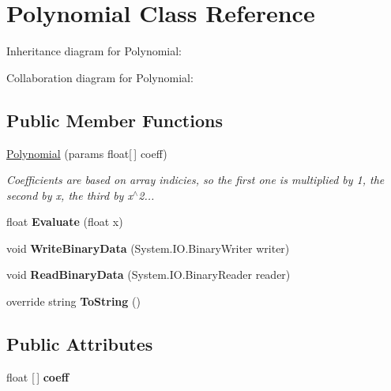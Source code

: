 \hypertarget{class_polynomial}{}\section{Polynomial Class Reference}
\label{class_polynomial}


Inheritance diagram for Polynomial\+:


Collaboration diagram for Polynomial\+:
\subsection*{Public Member Functions}
\begin{DoxyCompactItemize}
\item 
\hyperlink{class_polynomial_ad2d3944cfa448882204a0e698c2aa8c9}{Polynomial} (params float\mbox{[}$\,$\mbox{]} coeff)
\begin{DoxyCompactList}\small\item\em Coefficients are based on array indicies, so the first one is multiplied by 1, the second by x, the third by x$^\wedge$2... \end{DoxyCompactList}\item 
\mbox{\label{class_polynomial_a69e0b58ea78e39523e9b5e450be65fac}} 
float {\bfseries Evaluate} (float x)
\item 
\mbox{\label{class_polynomial_a675380767e4a19b06e2633d93ddeb415}} 
void {\bfseries Write\+Binary\+Data} (System.\+I\+O.\+Binary\+Writer writer)
\item 
\mbox{\label{class_polynomial_af7c4000b07055328c00e87979d7eee06}} 
void {\bfseries Read\+Binary\+Data} (System.\+I\+O.\+Binary\+Reader reader)
\item 
\mbox{\label{class_polynomial_a651a737e165ec271e9b8731021d1277f}} 
override string {\bfseries To\+String} ()
\end{DoxyCompactItemize}
\subsection*{Public Attributes}
\begin{DoxyCompactItemize}
\item 
\mbox{\label{class_polynomial_a91c3d9bdfef0ff967a36040b1755dac9}} 
float \mbox{[}$\,$\mbox{]} {\bfseries coeff}
\end{DoxyCompactItemize}


